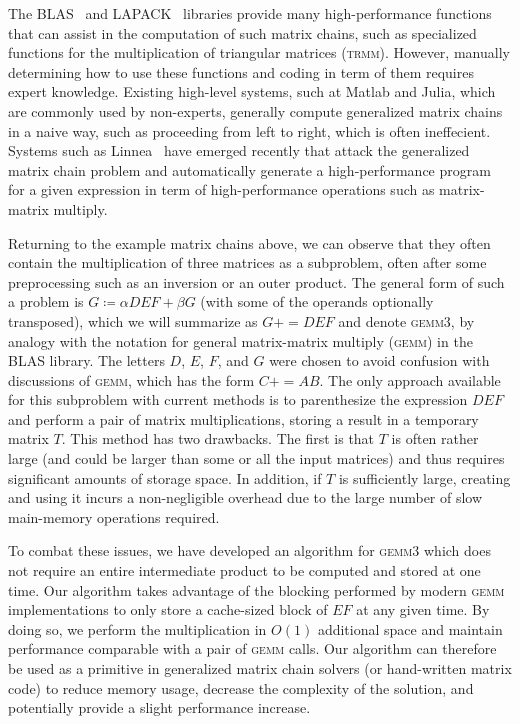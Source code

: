 \documentclass[12pt]{article}
\newcommand*{\pluseq}{\mathrel{{+}{=}}}
\newcommand*{\gemmt}{{\textsc{gemm3}}}
\newcommand*{\gemm}{{\textsc{gemm}}}
\newcommand*{\mycite}[1]{~\cite{#1}}
\begin{document}
The BLAS\mycite{blas_standard} and LAPACK\mycite{lapack_ug} libraries provide many high-performance functions that can assist in the computation of such matrix chains, such as specialized functions for the multiplication of triangular matrices (\textsc{trmm}).
However, manually determining how to use these functions and coding in term of them requires expert knowledge.
Existing high-level systems, such at Matlab and Julia, which are commonly used by non-experts, generally compute generalized matrix chains in a naive way, such as proceeding from left to right, which is often ineffecient.
Systems such as Linnea\mycite{Barthels2017} have emerged recently that attack the generalized matrix chain problem and automatically generate a high-performance program for a given expression in term of high-performance operations such as matrix-matrix multiply.

Returning to the example matrix chains above, we can observe that they often contain the multiplication of three matrices as a subproblem, often after some preprocessing such as an inversion or an outer product.
The general form of such a problem is $G \coloneqq \alpha DEF + \beta G$ (with some of the operands optionally transposed), which we will summarize as $G \pluseq DEF$ and denote \gemmt{}, by analogy with the notation for general matrix-matrix multiply (\gemm{}) in the BLAS library.
The letters $D$, $E$, $F$, and $G$ were chosen to avoid confusion with discussions of \gemm{}, which has the form $C \pluseq AB$.
The only approach available for this subproblem with current methods is to parenthesize the expression $DEF$ and perform a pair of matrix multiplications, storing a result in a temporary matrix $T$.
This method has two drawbacks.
The first is that $T$ is often rather large (and could be larger than some or all the input matrices) and thus requires significant amounts of storage space.
In addition, if $T$ is sufficiently large, creating and using it incurs a non-negligible overhead due to the large number of slow main-memory operations required.

To combat these issues, we have developed an algorithm for \gemmt{} which does not require an entire intermediate product to be computed and stored at one time.
Our algorithm takes advantage of the blocking performed by modern \gemm{} implementations to only store a cache-sized block of $EF$ at any given time.
By doing so, we perform the multiplication in $O(1)$ additional space and maintain performance comparable with a pair of \gemm{} calls.
Our algorithm can therefore be used as a primitive in generalized matrix chain solvers (or hand-written matrix code) to reduce memory usage, decrease the complexity of the solution, and potentially provide a slight performance increase.
\end{document}
